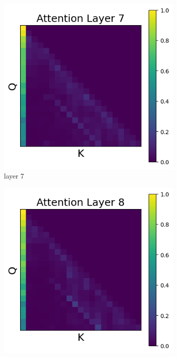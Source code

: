 \documentclass[11pt]{article}
\begin{document}
\begin{figure}[t]
    \begin{subfigure}[t]{0.24\textwidth}
    \centering
    \includegraphics[width=1.4\columnwidth]{figures/intervention5_2/layer_7.png}
    \caption{layer 7}
  \end{subfigure}\hfill
      \begin{subfigure}[t]{0.24\textwidth}
    \centering
    \includegraphics[width=1.4\columnwidth]{figures/intervention5_2/layer_8.png}

\end{subfigure}
\end{figure}
\end{document}
